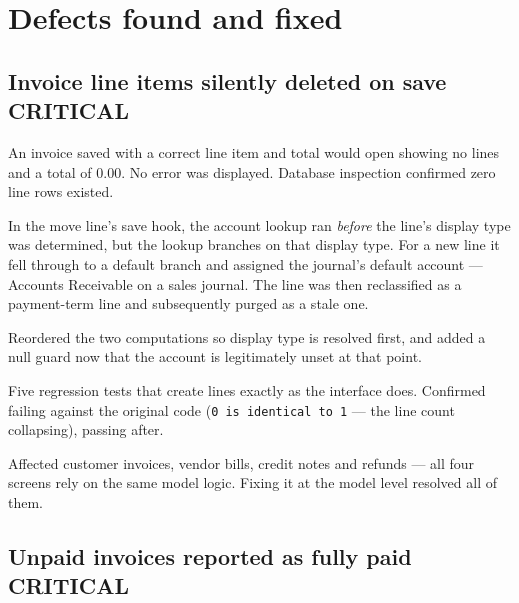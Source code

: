 \documentclass[11pt,a4paper]{article}
\newcommand{\sev}[2]{\textcolor{#1}{\small\textsf{\textbf{#2}}}}
\newcommand{\acct}[1]{\texttt{\small #1}}
\begin{document}
\newpage
\section{Defects found and fixed}

\subsection[Invoice line items silently deleted on save]{Invoice line items silently deleted on save \hfill \sev{critical}{CRITICAL}}

\begin{description}[leftmargin=!, labelwidth=2.4cm, font=\small\sffamily\bfseries\color{muted}]
  \item[Symptom] An invoice saved with a correct line item and total would open showing no lines and
    a total of 0.00. No error was displayed. Database inspection confirmed zero line rows existed.
  \item[Root cause] In the move line's save hook, the account lookup ran \emph{before} the line's
    display type was determined, but the lookup branches on that display type. For a new line it fell
    through to a default branch and assigned the journal's default account --- Accounts Receivable on a
    sales journal. The line was then reclassified as a payment-term line and subsequently purged as a
    stale one.
  \item[Fix] Reordered the two computations so display type is resolved first, and added a null guard
    now that the account is legitimately unset at that point.
  \item[Verification] Five regression tests that create lines exactly as the interface does. Confirmed
    failing against the original code (\acct{0 is identical to 1} --- the line count collapsing),
    passing after.
  \item[Scope] Affected customer invoices, vendor bills, credit notes and refunds --- all four screens
    rely on the same model logic. Fixing it at the model level resolved all of them.
\end{description}

\subsection[Unpaid invoices reported as fully paid]{Unpaid invoices reported as fully paid \hfill \sev{critical}{CRITICAL}}
\end{document}
